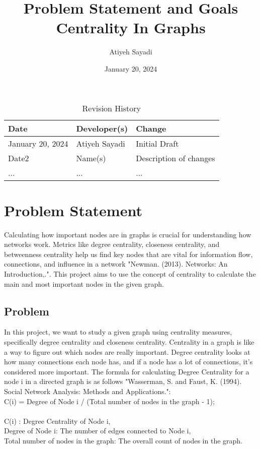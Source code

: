 \documentclass{article}
\title{Problem Statement and Goals\\Centrality In Graphs}
\author{Atiyeh Sayadi}
\date{January 20, 2024}
\begin{document}
\maketitle

\begin{table}[hp]
\caption{Revision History} \label{TblRevisionHistory}
\begin{tabularx}{\textwidth}{llX}
\toprule
\textbf{Date} & \textbf{Developer(s)} & \textbf{Change}\\
\midrule
January 20, 2024 & Atiyeh Sayadi & Initial Draft\\
Date2 & Name(s) & Description of changes\\
... & ... & ...\\
\bottomrule
\end{tabularx}
\end{table}

\section{Problem Statement}

Calculating how important nodes are in graphs is crucial for understanding how networks work. Metrics like degree centrality, closeness centrality, and betweenness centrality help us find key nodes that are vital for information flow, connections, and influence in a network "Newman. (2013).  Networks: An Introduction,.". This project aims to use the concept of centrality to calculate the main and most important nodes in the given graph.

\subsection{Problem}

In this project, we want to study a given graph using centrality measures, specifically degree centrality and closeness centrality. Centrality in a graph is like a way to figure out which nodes are really important. Degree centrality looks at how many connections each node has, and if a node has a lot of connections, it's considered more important. The formula for calculating Degree Centrality for a node i in a directed graph is as follows "Wasserman, S. and Faust, K. (1994). Social Network Analysis: Methods and Applications.":\\

C(i) = Degree of Node i / (Total number of nodes in the graph - 1);\\
\\
C(i) : Degree Centrality of Node i,\\
Degree of Node i: The number of edges connected to Node i,\\
Total number of nodes in the graph: The overall count of nodes in the graph.\\
\end{document}
